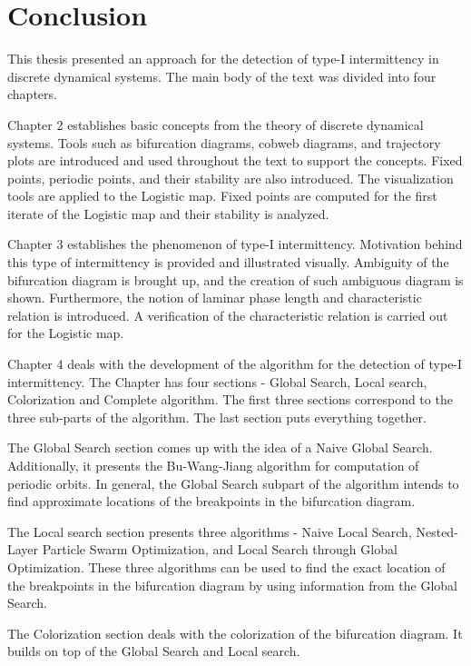 \chapter{Conclusion}

This thesis presented an approach for the detection of type-I intermittency in discrete dynamical systems.
The main body of the text was divided into four chapters.
\par
Chapter 2 establishes basic concepts from the theory of discrete dynamical systems.
Tools such as bifurcation diagrams, cobweb diagrams, and trajectory plots are introduced and used throughout the text to support the concepts.
Fixed points, periodic points, and their stability are also introduced.
The visualization tools are applied to the Logistic map.
Fixed points are computed for the first iterate of the Logistic map and their stability is analyzed.
\par
Chapter 3 establishes the phenomenon of type-I intermittency.
Motivation behind this type of intermittency is provided and illustrated visually.
Ambiguity of the bifurcation diagram is brought up, and the creation of such ambiguous diagram is shown.
Furthermore, the notion of laminar phase length and characteristic relation is introduced.
A verification of the characteristic relation is carried out for the Logistic map.
\par
Chapter 4 deals with the development of the algorithm for the detection of type-I intermittency.
The Chapter has four sections - Global Search, Local search, Colorization and Complete algorithm.
The first three sections correspond to the three sub-parts of the algorithm.
The last section puts everything together.
\par
The Global Search section comes up with the idea of a Naive Global Search.
Additionally, it presents the Bu-Wang-Jiang algorithm for computation of periodic orbits.
In general, the Global Search subpart of the algorithm intends to find approximate locations of the breakpoints in the bifurcation diagram.
\par
The Local search section presents three algorithms - Naive Local Search, Nested-Layer Particle Swarm Optimization, and Local Search through Global Optimization.
These three algorithms can be used to find the exact location of the breakpoints in the bifurcation diagram by using information from the Global Search.
\par
The Colorization section deals with the colorization of the bifurcation diagram.
It builds on top of the Global Search and Local search.
